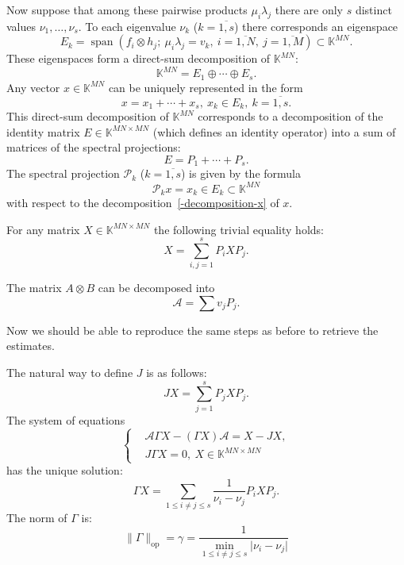 \documentclass[14pt,a4paper]{extarticle}
\theoremstyle{definition}
\begin{document}
Now suppose that among these pairwise products \( \mu_i \lambda_j \)
    there are only \( s \) distinct values \( \nu_1, \ldots, \nu_s \).
To each eigenvalue \( \nu_k \) (\( k{=}\overline{1,s} \)) there corresponds
    an eigenspace \[ E_k = \operatorname{span}(f_i\otimes h_j;\ \mu_i\lambda_j = v_k,\ i{=}\overline{1,N},\ j{=}\overline{1,M}) \subset \mathbb{K}^{MN}. \]
These eigenspaces form a direct-sum decomposition of \( \mathbb{K}^{MN} \):
    \[ \mathbb{K}^{MN} = E_1 \oplus \cdots \oplus E_s. \]
Any vector \( x\in\mathbb{K}^{MN} \) can be uniquely represented
    in the form
    \begin{equation}\label{-decomposition-x}
        x = x_1 + \cdots + x_s,\ x_k\in E_k,\ k=\overline{1,s}.
    \end{equation}
This direct-sum decomposition of \( \mathbb{K}^{MN} \)
    corresponds to a decomposition of the identity matrix \( E\in \mathbb{K}^{MN{\times}MN} \)
    (which defines an identity operator)
    into a sum of matrices of the spectral projections:
    \[
        E = P_1 + \cdots + P_s.
    \]
The spectral projection \( \mathcal{P}_k \) (\(k{=}\overline{1,s}\)) is given by the formula
    \[
        \mathcal{P}_k x = x_k \in E_k\subset \mathbb{K}^{MN}
    \]
    with respect to the decomposition~\eqref{-decomposition-x} of \( x \).

For any matrix \( X\in \mathbb{K}^{MN{\times}MN} \)
    the following trivial equality holds:
    \[
        X = \sum_{i,j=1}^s P_i X P_j.
    \]

The matrix \( A\otimes B \) can be decomposed into
    \[
        \mathcal{A} = \sum v_j P_j.
    \]

Now we should be able to reproduce the same steps as before
    to retrieve the estimates.

The natural way to define \( J \) is as follows:
    \[
        JX = \sum_{j=1}^s P_j X P_j.
    \]
The system of equations
    \[\left\{\begin{aligned}
        & \mathcal{A}\Gamma X - (\Gamma X) \mathcal{A} = X - JX, \\
        & J\Gamma X = 0,\ X\in \mathbb{K}^{MN{\times}MN}
    \end{aligned}\right.\]
    has the unique solution:
    \[
        \Gamma X = \sum_{1\leq i{\neq}j \leq s} \frac{1}{\nu_i-\nu_j} P_i X P_j.
    \]
    The norm of \( \Gamma \) is:
    \[
        \|\Gamma\|_{\mathrm{op}} = \gamma = \frac{1}{\min_{1\leq i{\neq}j\leq s}\lvert\nu_i - \nu_j\rvert}
    \]
\end{document}
